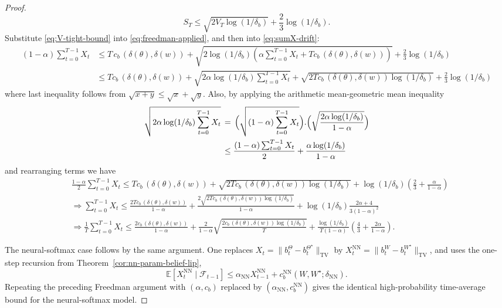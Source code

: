 \documentclass[10pt]{article} %
\theoremstyle{plain}
\theoremstyle{definition}
\theoremstyle{remark}
\newcommand{\bE}{\mathbb{E}}
\begin{document}
\begin{proof}
\begin{equation}
S_{T}\le \sqrt{2V_{T}\log(1/\delta_b)}+\frac{2}{3}\log(1/\delta_b).
\end{equation}
Substitute \ref{eq:V-tight-bound} into \ref{eq:freedman-applied}, and then into \ref{eq:sumX-drift}:
\begin{align*}
(1-\alpha)\sum_{t=0}^{T-1}X_t
&\le
T\,c_b\,(\delta(\theta),\delta(w)) + \sqrt{2 \log(1/\delta_b) (\alpha \sum_{t=0}^{T-1}X_t + T c_b\,(\delta(\theta),\delta(w)))} + \frac{2}{3}\log(1/\delta_b) \\
&\le T c_b\,(\delta(\theta),\delta(w)) + \sqrt{2\alpha \log(1/\delta_b) \sum_{t=0}^{T-1}X_t} + \sqrt{2 T c_b\,(\delta(\theta),\delta(w)) \log(1/\delta_b)} + \frac{2}{3}\log(1/\delta_b)
\end{align*}
where last inequality follows from $\sqrt{x+y}\le\sqrt{x}+\sqrt{y}$. Also, by applying the arithmetic mean-geometric mean inequality 
\begin{align*}
\sqrt{2\alpha \log(1/\delta_b)\sum_{t=0}^{T-1}X_t}\,&=\,\Bigl(\sqrt{(1-\alpha)\sum_{t=0}^{T-1}X_t}\Bigr).\Bigl(\sqrt{\frac{2\alpha\log(1/\delta_b)}{1-\alpha}}\Bigr)\\
&\le\frac{(1-\alpha)\sum_{t=0}^{T-1}X_t}{2}+\frac{\alpha\log(1/\delta_b)}{1-\alpha}
\end{align*}
and rearranging terms we have
\begin{align*}
&\frac{1-\alpha}{2}\sum_{t=0}^{T-1}X_t \le T c_b\,(\delta(\theta),\delta(w)) + \sqrt{2 T c_b\,(\delta(\theta),\delta(w)) \log(1/\delta_b)} + \log(1/\delta_b)\left(\frac{2}{3} + \frac{\alpha}{1-\alpha}\right)\\
&\Rightarrow \sum_{t=0}^{T-1}X_t\le \frac{2T c_b\,(\delta(\theta),\delta(w))}{1-\alpha}+\frac{2\sqrt{2 T c_b\,(\delta(\theta),\delta(w)) \log(1/\delta_b)}}{1-\alpha}+\log(1/\delta_b)\frac{2\alpha+4}{3(1-\alpha)^2}\\
&\Rightarrow \frac{1}{T}\sum_{t=0}^{T-1}X_t \le \frac{2c_b\,(\delta(\theta),\delta(w))}{1-\alpha} + \frac{2}{1-\alpha}\sqrt{\frac{2 c_b\,(\delta(\theta),\delta(w)) \log(1/\delta_b)}{T}} + \frac{\log(1/\delta_b)}{T(1-\alpha)}\left(\frac{4}{3} + \frac{2\alpha}{1-\alpha}\right).
\end{align*}

The neural-softmax case follows by the same argument. One replaces
\(X_t=\|b_t^\Theta-b_t^{\Theta^\star}\|_{\mathrm{TV}}\) by
\(X_t^{\mathrm{NN}}=\|b_t^W-b_t^{W^\star}\|_{\mathrm{TV}}\), and uses the
one-step recursion from Theorem~\ref{cor:nn-param-belief-lip},
\[
\bE[X_t^{\mathrm{NN}}\mid\mathcal F_{t-1}]\le\alpha_{\mathrm{NN}}X_{t-1}^{\mathrm{NN}}
+c_b^{\mathrm{NN}}(W,W^\star;\delta_{\mathrm{NN}}).\]
Repeating the preceding Freedman argument with
\((\alpha,c_b)\) replaced by
\((\alpha_{\mathrm{NN}},c_b^{\mathrm{NN}})\) gives the identical
high-probability time-average bound for the neural-softmax model.
\end{proof}
\end{document}
